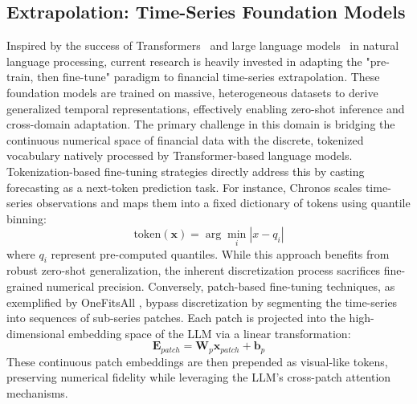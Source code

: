 \documentclass[11pt,a4paper]{article}
\begin{document}
\subsection{Extrapolation: Time-Series Foundation Models}

Inspired by the success of Transformers~\citep{vaswani2017attention} and large language models~\citep{brown2020language} in natural language processing, current research is heavily invested in adapting the "pre-train, then fine-tune" paradigm to financial time-series extrapolation. These foundation models are trained on massive, heterogeneous datasets to derive generalized temporal representations, effectively enabling zero-shot inference and cross-domain adaptation. The primary challenge in this domain is bridging the continuous numerical space of financial data with the discrete, tokenized vocabulary natively processed by Transformer-based language models. Tokenization-based fine-tuning strategies directly address this by casting forecasting as a next-token prediction task. For instance, Chronos \citep{ansari2024chronos} scales time-series observations and maps them into a fixed dictionary of tokens using quantile binning:
\begin{equation}
\text{token}(\mathbf{x}) = \arg\min_i |x - q_i|
\end{equation}
where $q_i$ represent pre-computed quantiles. While this approach benefits from robust zero-shot generalization, the inherent discretization process sacrifices fine-grained numerical precision. Conversely, patch-based fine-tuning techniques, as exemplified by OneFitsAll \citep{zhou2023onefitsall}, bypass discretization by segmenting the time-series into sequences of sub-series patches. Each patch is projected into the high-dimensional embedding space of the LLM via a linear transformation:
\begin{equation}
\mathbf{E}_{patch} = \mathbf{W}_p \mathbf{x}_{patch} + \mathbf{b}_p
\end{equation}
These continuous patch embeddings are then prepended as visual-like tokens, preserving numerical fidelity while leveraging the LLM's cross-patch attention mechanisms.
\end{document}

